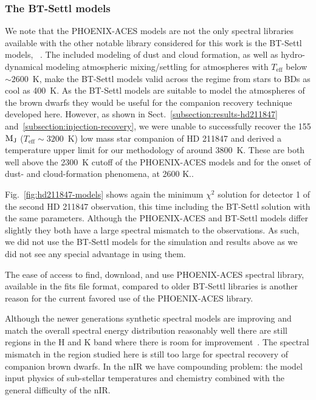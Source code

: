 \documentclass[fleqn,usenatbib]{mnras}
\begin{document}
\subsubsection{The BT-Settl models}
\label{subsubsec:bt-settl}
We note that the PHOENIX-ACES models are not the only spectral libraries available with the other notable library considered for this work is the BT-Settl models, ~\citep{allard_model_2010,allard_btsettl_2013,baraffe_new_2015}. The included modeling of dust and cloud formation, as well as hydro-dynamical modeling atmospheric mixing/settling for atmospheres with \(T_{\textrm{eff}}\) below \(\sim2600\)~K, make the BT-Settl models valid across the regime from stars to BDs as cool as 400~K. As the BT-Settl models are suitable to model the atmospheres of the brown dwarfs they would be useful for the companion recovery technique developed here. However, as shown in Sect.~\ref{subsection:results-hd211847} and~\ref{subsection:injection-recovery}, we were unable to successfully recover the 155 \(\rm M_J\) (\(T_{\textrm{eff}}\sim3200\)~K) low mass star companion of {HD 211847} and derived a temperature upper limit for our methodology of around 3800~K. These are both well above the 2300~K cutoff of the PHOENIX-ACES models and for the onset of dust- and cloud-formation phenomena, at 2600 K..

Fig.~\ref{fig:hd211847-models} shows again the minimum \(\chi^2\) solution for detector 1 of the second {HD 211847} observation, this time including the BT-Settl solution with the same parameters. Although the PHOENIX-ACES and BT-Settl models differ slightly they both have a large spectral mismatch to the observations. As such, we did not use the BT-Settl models for the simulation and results above as we did not see any special advantage in using them. 

The ease of access to find, download, and use PHOENIX-ACES spectral library, available in the fits file format, compared to older BT-Settl libraries is another reason for the current favored use of the PHOENIX-ACES library.

Although the newer generations synthetic spectral models are improving and match the overall spectral energy distribution reasonably well there are still regions in the H and K band where there is room for improvement~\citet{rajpurohit_spectral_2016}. The spectral mismatch in the region studied here is still too large for spectral recovery of companion brown dwarfs. In the nIR we have compounding problem: the model input physics of sub-stellar temperatures and chemistry combined with the general difficulty of the nIR.
\end{document}

